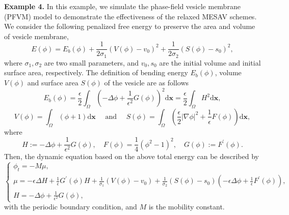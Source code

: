 \documentclass[final,review,onefignum,onetabnum]{siamart190516}
\theoremstyle{plain}
\begin{document}
 \textbf{Example 4.} 
 In this example, we simulate the phase-field vesicle membrane (PFVM) model \cite{cheng2018multiple, cheng2020global} to demonstrate the effectiveness of the relaxed MESAV schemes. We consider the following penalized free energy to preserve the  area and volume of vesicle membrane, 
\begin{equation}
	E(\phi)=E_{b}(\phi)+\frac{1}{2 \sigma_{1}}(V(\phi)-v_0)^{2}+\frac{1}{2 \sigma_{2}}(S(\phi)-s_0)^{2},
\end{equation}
where $\sigma_{1}, \sigma_{2}$ are two small parameters, and $v_0, s_0$ are the initial volume and initial surface area, respectively. The definition of  bending energy $E_b(\phi)$, volume $V(\phi)$ and surface area $S(\phi)$ of the vesicle are as follows
\begin{equation}
	E_{b}(\phi)=\frac{\epsilon}{2} \int_{\Omega}\left(-\Delta \phi+\frac{1}{\epsilon^{2}} G(\phi)\right)^{2} \mathrm{d} \boldsymbol{x}=\frac{\epsilon}{2} \int_{\Omega} H^{2} \mathrm{d} \boldsymbol{x},
\end{equation}
\begin{equation}
	V(\phi)=\int_{\Omega}(\phi+1) \mathrm{d} \boldsymbol{x} \quad \text { and } \quad S(\phi)=\int_{\Omega}\left(\frac{\epsilon}{2}|\nabla \phi|^{2}+\frac{1}{\epsilon} F(\phi)\right) \mathrm{d} \boldsymbol{x},
\end{equation}
where
$$
H:=-\Delta \phi+\frac{1}{\epsilon^{2}} G(\phi), \quad F(\phi)=\frac{1}{4}\left(\phi^{2}-1\right)^{2}, \quad G(\phi):=F^{\prime}(\phi).
$$
Then,  the dynamic equation based on the above total energy can be described by 
\begin{equation}\label{eq:PFVM-model}
	\left\{
	\begin{array}{l}\phi_{t}=-M \mu, \\ 
		\mu=-\epsilon \Delta H+\frac{1}{\epsilon} G^{\prime}(\phi) H+\frac{1}{\sigma_{1}}(V(\phi)-v_0)+\frac{1}{\sigma_{2}}(S(\phi)-s_0)\left(-\epsilon \Delta \phi+\frac{1}{\epsilon} F^{\prime}(\phi)\right), \\ 
		H=-\Delta \phi+\frac{1}{\epsilon^{2}} G(\phi),
	\end{array} \right.
\end{equation}
with the periodic boundary condition, 
and $M$ is the mobility constant. 
\end{document}
